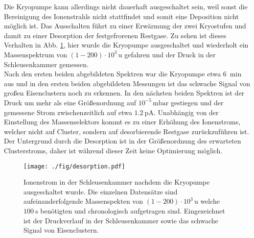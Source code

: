 Die Kryopumpe kann allerdings nicht dauerhaft ausgeschaltet sein, weil sonst die Bereinigung des Ionenstrahls nicht stattfindet und somit eine Deposition nicht möglich ist.
Das Ausschalten führt zu einer Erwärmung der zwei Kryostufen und damit zu einer Desorption der festgefrorenen Restgase.
Zu sehen ist dieses Verhalten in Abb. \ref{fig:desorp}, hier wurde die Kryopumpe ausgeschaltet und wiederholt ein Massenspektrum von $(1-200)\cdot 10^3\,\text{u}$ gefahren und der Druck in der Schleusenkammer gemessen.\\
Nach den ersten beiden abgebildeten Spektren war die Kryopumpe etwa $\SI{6}{\min}$ aus und in den ersten beiden abgebildeten Messungen ist das schwache Signal von großen Eisenclustern noch zu erkennen.
In den nächsten beiden Spektren ist der Druck um mehr als eine Größenordnung auf $10^{-5}\,\text{mbar}$ gestiegen und der gemessene Strom zwischenzeitlich auf etwa $\SI{1.2}{\pA}$.
Unabhängig von der Einstellung des Massenselektors kommt es zu einer Erhöhung des Ionenstroms, welcher nicht auf Cluster, sondern auf desorbierende Restgase zurückzuführen ist.
Der Untergrund durch die Desorption ist in der Größenordnung des erwarteten Clusterstroms, daher ist während dieser Zeit keine Optimierung möglich.
\begin{figure}
  \centering
  \texttt{[image: ./fig/desorption.pdf]}
  \caption{Ionenstrom in der Schleusenkammer nachdem die Kryopumpe ausgeschaltet wurde. Die einzelnen Datensätze sind aufeinanderfolgende Massenspekten von $(1-200)\cdot 10^3\,\text{u}$ welche $\SI{100}{\second}$ benötigten und chronologisch aufgetragen sind. Eingezeichnet ist der Druckverlauf in der Schleusenkammer sowie das schwache Signal von Eisenclustern.}
  \label{fig:desorp}
\end{figure}

